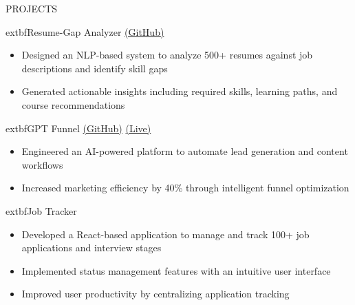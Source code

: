 \documentclass{resume}
\begin{document}

\begin{rSection}{PROJECTS}

	extbf{Resume-Gap Analyzer} \href{https://github.com/pranjalprog/resume_gap_analyser}{(GitHub)}
\begin{itemize}
    \item Designed an NLP-based system to analyze 500+ resumes against job descriptions and identify skill gaps
    \item Generated actionable insights including required skills, learning paths, and course recommendations
\end{itemize}

	extbf{GPT Funnel} \href{https://github.com/pranjalprog/resume_gap_analyser}{(GitHub)} \href{https://www.gtmfunnels.ai/}{(Live)}
\begin{itemize}
    \item Engineered an AI-powered platform to automate lead generation and content workflows
    \item Increased marketing efficiency by 40\% through intelligent funnel optimization
\end{itemize}

	extbf{Job Tracker}
\begin{itemize}
    \item Developed a React-based application to manage and track 100+ job applications and interview stages
    \item Implemented status management features with an intuitive user interface
    \item Improved user productivity by centralizing application tracking
\end{itemize}

\end{rSection}
\end{document}
